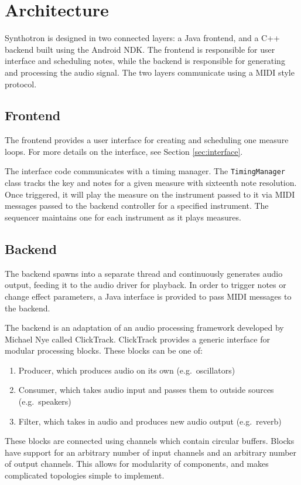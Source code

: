 \documentclass[letterpaper,12pt]{article}
\begin{document}
\section{Architecture}

Synthotron is designed in two connected layers: a Java frontend, and a C++ backend built using the Android NDK. The frontend is responsible for user interface and scheduling notes, while the backend is responsible for generating and processing the audio signal. The two layers communicate using a MIDI style protocol.

\subsection{Frontend}

The frontend provides a user interface for creating and scheduling one measure loops. For more details on the interface, see Section \ref{sec:interface}.

The interface code communicates with a timing manager. The \texttt{TimingManager} class tracks the key and notes for a given measure with sixteenth note resolution. Once triggered, it will play the measure on the instrument passed to it via MIDI messages passed to the backend controller for a specified instrument. The sequencer maintains one for each instrument as it plays measures.

\subsection{Backend}

The backend spawns into a separate thread and continuously generates audio output, feeding it to the audio driver for playback. In order to trigger notes or change effect parameters, a Java interface is provided to pass MIDI messages to the backend.

The backend is an adaptation of an audio processing framework developed by Michael Nye called ClickTrack\cite{clicktrack}. ClickTrack provides a generic interface for modular processing blocks. These blocks can be one of:
\begin{enumerate}
    \item Producer, which produces audio on its own (e.g.\ oscillators)
    \item Consumer, which takes audio input and passes them to outside sources (e.g.\ speakers)
    \item Filter, which takes in audio and produces new audio output (e.g.\ reverb)
\end{enumerate}
These blocks are connected using channels which contain circular buffers. Blocks have support for an arbitrary number of input channels and an arbitrary number of output channels. This allows for modularity of components, and makes complicated topologies simple to implement.
\end{document}
